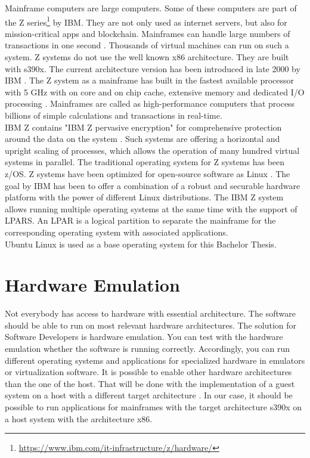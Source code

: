 Mainframe computers are large computers. Some of these computers are part of the Z series\footnote{\url{https://www.ibm.com/it-infrastructure/z/hardware/}} by IBM. They are not only used as internet servers, but also for mission-critical apps and blockchain. 
Mainframes can handle large numbers of transactions in one second \cite[~p.56]{Tanenbaum2014}. 
Thousands of virtual machines can run on such a system. \gls{Z systems} do not use the well known x86 architecture. 
They are built with s390x. The current architecture version has been introduced in late 2000 by IBM \cite[~p.15]{Block2019}. The Z system as a mainframe has built in the fastest available processor with 5 GHz with on core and on chip cache, extensive memory and dedicated I/O processing \cite{OpenMainframeProject}.
Mainframes are called as high-performance computers that process billions of simple calculations and transactions in real-time.\\
IBM Z contains "IBM Z pervasive encryption" for comprehensive protection around the data on the system \cite[~p.4]{Lascu2020}. Such systems are offering a horizontal and upright \gls{scaling} of processes, which allows the operation of many hundred virtual systems in parallel\cite[~p.13]{Tschoeke2009}. The traditional operating system for Z systems has been z/OS. 
Z systems have been optimized for open-source software as Linux \cite[~p.8]{Lascu2020}. The goal by IBM has been to offer a combination of a robust and securable hardware platform with the power of different Linux distributions. 
The IBM Z system allows running multiple operating systems at the same time with the support of LPARS.
An \gls{LPAR} is a logical partition to separate the mainframe for the corresponding operating system with associated applications. \\
Ubuntu Linux is used as a base operating system for this Bachelor Thesis.


\section{Hardware Emulation}

Not everybody has access to hardware with essential architecture. The software should be able to run on most relevant hardware architectures. The solution for Software Developers is hardware emulation. 
You can test with the hardware emulation whether the software is running correctly. 
Accordingly, you can run different operating systems and applications for specialized hardware in emulators or virtualization software. 
It is possible to enable other hardware architectures than the one of the host. 
That will be done with the implementation of a guest system on a host with a different target architecture \cite[~p.3]{Rosenthal2015}. In our case, it should be possible to run applications for mainframes with the target
architecture s390x on a host system with the architecture x86.


